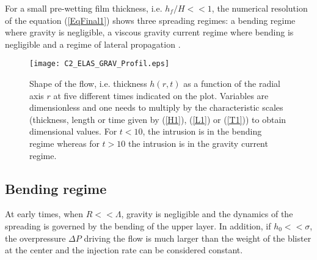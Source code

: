 For  a  small  pre-wetting   film  thickness,  i.e.   $h_f/H<<1$,  the
numerical  resolution of  the  equation  (\ref{EqFinal1}) shows  three
spreading  regimes:
a  bending  regime where  gravity  is  negligible, a  viscous  gravity
current regime  where bending  is negligible and  a regime  of lateral
propagation \citep{Michaut:2011kg,Bunger:2011cb,Lister:2013ia}.

  \begin{figure}[h!]
    \begin{center}
    \graphicspath{ {/Users/thorey/Documents/These/Manuscript/Figure/Chapter2/} }
      \texttt{[image: C2\_ELAS\_GRAV\_Profil.eps]}
      \caption{Shape  of   the  flow,  i.e.  thickness
        $h(r,t)$ as  a function of  the radial  axis $r$
        at five different  times indicated on the  plot. Variables are
        dimensionless and one needs  to multiply by the characteristic
        scales  (thickness,  length  or   time  given  by  (\ref{H1}),
        (\ref{L1}) or  (\ref{T1})) to  obtain dimensional  values. For
        $t<10$,  the intrusion  is  in the  bending  regime whereas  for
        $t>10$ the intrusion is in the gravity current regime.}
      \label{C2_ELAS_GRAV_Profil}
    \end{center}
  \end{figure}

\subsection{Bending regime}
\label{C2-sec:bending-regime}

At  early times,  when  $R<<\Lambda$, gravity  is  negligible and  the
dynamics of  the spreading  is governed  by the  bending of  the upper
layer.   In addition,  if $h_0<<\sigma$,  the overpressure  $\Delta P$
driving the flow is much larger than  the weight of the blister at the
center and the injection rate can be considered constant.

